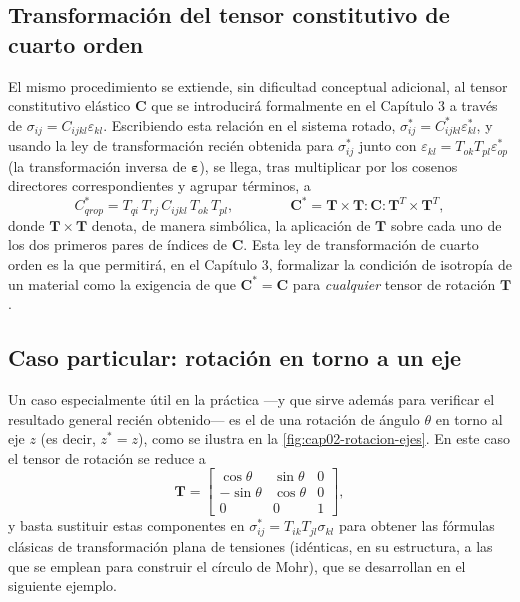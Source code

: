 \subsection{Transformación del tensor constitutivo de cuarto orden}

El mismo procedimiento se extiende, sin dificultad conceptual adicional, al tensor constitutivo elástico $\bm C$ que se introducirá formalmente en el Capítulo 3 a través de $\sigma_{ij}=C_{ijkl}\varepsilon_{kl}$. Escribiendo esta relación en el sistema rotado, $\sigma^*_{ij}=C^*_{ijkl}\varepsilon^*_{kl}$, y usando la ley de transformación recién obtenida para $\sigma^*_{ij}$ junto con $\varepsilon_{kl}=T_{ok}T_{pl}\varepsilon^*_{op}$ (la transformación inversa de $\bm\varepsilon$), se llega, tras multiplicar por los cosenos directores correspondientes y agrupar términos, a
\[
C^{*}_{qrop} = T_{qi}\,T_{rj}\,C_{ijkl}\,T_{ok}\,T_{pl}, \qquad\qquad \bm C^{*} = \bm T\times\bm T : \bm C : \bm T^{T}\times\bm T^{T},
\]
donde $\bm T\times\bm T$ denota, de manera simbólica, la aplicación de $\bm T$ sobre cada uno de los dos primeros pares de índices de $\bm C$. Esta ley de transformación de cuarto orden es la que permitirá, en el Capítulo 3, formalizar la condición de isotropía de un material como la exigencia de que $\bm C^{*}=\bm C$ para \emph{cualquier} tensor de rotación $\bm T$.

\subsection{Caso particular: rotación en torno a un eje}

Un caso especialmente útil en la práctica —y que sirve además para verificar el resultado general recién obtenido— es el de una rotación de ángulo $\theta$ en torno al eje $z$ (es decir, $z^*=z$), como se ilustra en la \cref{fig:cap02-rotacion-ejes}. En este caso el tensor de rotación se reduce a
\[
\bm T =
\begin{bmatrix}
\cos\theta & \sin\theta & 0 \\
-\sin\theta & \cos\theta & 0 \\
0 & 0 & 1
\end{bmatrix},
\]
y basta sustituir estas componentes en $\sigma^{*}_{ij}=T_{ik}T_{jl}\sigma_{kl}$ para obtener las fórmulas clásicas de transformación plana de tensiones (idénticas, en su estructura, a las que se emplean para construir el círculo de Mohr), que se desarrollan en el siguiente ejemplo.

